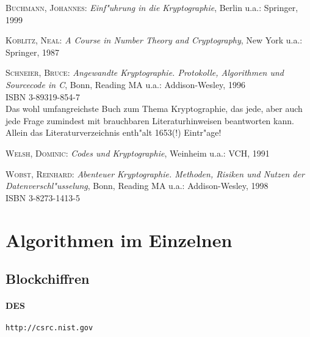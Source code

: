 \begin{description}
  
\item \textsc{Buchmann, Johannes}: \textit{Einf"uhrung in die
    Kryptographie}, Berlin u.a.: Springer, 1999
  
\item \textsc{Koblitz, Neal}: \textit{A Course in Number Theory and
    Cryptography}, New York u.a.: Springer, 1987
  
\item \textsc{Schneier, Bruce}: \textit{Angewandte Kryptographie.
    Protokolle, Algorithmen und Sourcecode in C},
  Bonn, Reading MA u.a.: Addison-Wesley, 1996 \\
  ISBN 3-89319-854-7 \\
  Das wohl umfangreichste Buch zum Thema Kryptographie, das jede, aber
  auch jede Frage zumindest mit brauchbaren Literaturhinweisen
  beantworten kann. Allein das Literaturverzeichnis enth"alt 1653(!)
  Eintr"age!
  
\item \textsc{Welsh, Dominic}: \textit{Codes und Kryptographie},
  Weinheim u.a.: VCH, 1991
  
\item \textsc{Wobst, Reinhard}: \textit{Abenteuer Kryptographie.
    Methoden, Risiken und Nutzen der Datenverschl"usselung},
  Bonn, Reading MA u.a.: Addison-Wesley, 1998 \\
  ISBN 3-8273-1413-5


\end{description}


\section{Algorithmen im Einzelnen}


\subsection{Blockchiffren}


\paragraph{DES}

\texttt{http://csrc.nist.gov}

